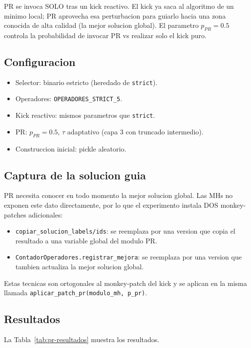 PR se invoca SOLO tras un kick reactivo. El kick ya saca al algoritmo
de un minimo local; PR aprovecha esa perturbacion para guiarlo hacia
una zona conocida de alta calidad (la mejor solucion global). El
parametro $p_{PR} = 0.5$ controla la probabilidad de invocar PR vs
realizar solo el kick puro.

\subsection{Configuracion}

\begin{itemize}
\item Selector: binario estricto (heredado de \texttt{strict}).
\item Operadores: \texttt{OPERADORES\_STRICT\_5}.
\item Kick reactivo: mismos parametros que \texttt{strict}.
\item PR: $p_{PR} = 0.5$, $\tau$ adaptativo (capa 3 con
  truncado intermedio).
\item Construccion inicial: pickle aleatorio.
\end{itemize}

\subsection{Captura de la solucion guia}

PR necesita conocer en todo momento la mejor solucion global. Las MHs
no exponen este dato directamente, por lo que el experimento instala
DOS monkey-patches adicionales:

\begin{itemize}
\item \texttt{copiar\_solucion\_labels/ids}: se reemplaza por una
  version que copia el resultado a una variable global del modulo PR.
\item \texttt{ContadorOperadores.registrar\_mejora}: se reemplaza por
  una version que tambien actualiza la mejor solucion global.
\end{itemize}

Estas tecnicas son ortogonales al monkey-patch del kick y se aplican en
la misma llamada \texttt{aplicar\_patch\_pr(modulo\_mh, p\_pr)}.

\subsection{Resultados}

La Tabla~\ref{tab:pr-resultados} muestra los resultados.

